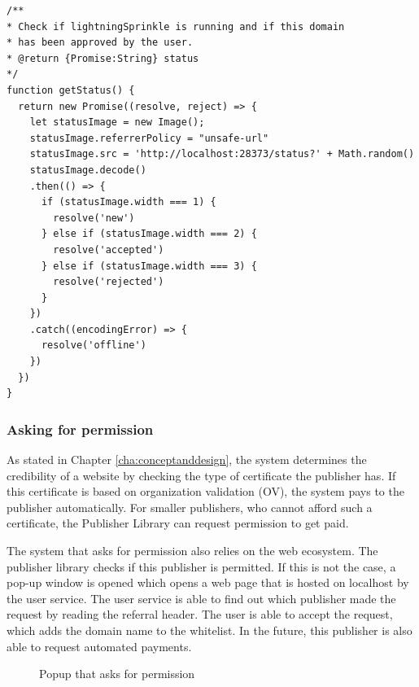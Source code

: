 \lstset{language=JavaScript}
\lstset{frame=lines}
\lstset{basicstyle=\footnotesize}
\begin{lstlisting}
/**
* Check if lightningSprinkle is running and if this domain 
* has been approved by the user.
* @return {Promise:String} status
*/
function getStatus() {
  return new Promise((resolve, reject) => {
    let statusImage = new Image();
    statusImage.referrerPolicy = "unsafe-url"
    statusImage.src = 'http://localhost:28373/status?' + Math.random()
    statusImage.decode()
    .then(() => {
      if (statusImage.width === 1) {
        resolve('new')
      } else if (statusImage.width === 2) {
        resolve('accepted')
      } else if (statusImage.width === 3) {
        resolve('rejected')
      }
    })
    .catch((encodingError) => {
      resolve('offline')
    })
  })
}
\end{lstlisting}

\subsubsection{Asking for permission}
As stated in Chapter \ref{cha:conceptanddesign}, the system determines the credibility of a website by checking the type of certificate the publisher has. If this certificate is based on organization validation (OV), the system pays to the publisher automatically. For smaller publishers, who cannot afford such a certificate, the Publisher Library can request permission to get paid. 

The system that asks for permission also relies on the web ecosystem. The publisher library checks if this publisher is permitted. If this is not the case, a pop-up window is opened which opens a web page that is hosted on localhost by the user service. The user service is able to find out which publisher made the request by reading the referral header. The user is able to accept the request, which adds the domain name to the whitelist. In the future, this publisher is also able to request automated payments.

\begin{figure}[h!]
  \setlength{\fboxsep}{0pt}%
  \caption{Popup that asks for permission}
\end{figure}

